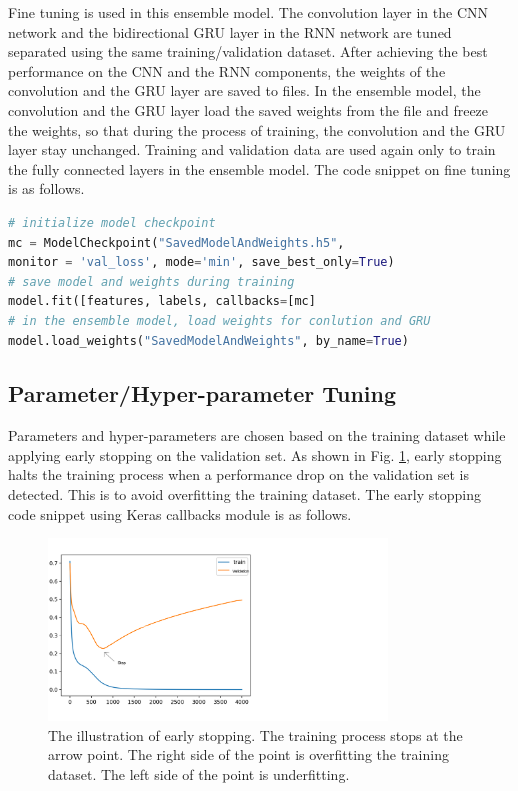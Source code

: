 Fine tuning is used in this ensemble model. The convolution layer in the CNN network and the bidirectional GRU layer in the RNN network are tuned separated using the same training/validation dataset. After achieving the best performance on the CNN and the RNN components, the weights of the convolution and the GRU layer are saved to files. In the ensemble model, the convolution and the GRU layer load the saved weights from the file and freeze the weights, so that during the process of training, the convolution and the GRU layer stay unchanged. Training and validation data are used again only to train the fully connected layers in the ensemble model. The code snippet on fine tuning is as follows.
\begin{lstlisting}[language=python,frame=single]
# initialize model checkpoint
mc = ModelCheckpoint("SavedModelAndWeights.h5",
monitor = 'val_loss', mode='min', save_best_only=True)
# save model and weights during training
model.fit([features, labels, callbacks=[mc]
# in the ensemble model, load weights for conlution and GRU
model.load_weights("SavedModelAndWeights", by_name=True)
\end{lstlisting}

\subsection{Parameter/Hyper-parameter Tuning}
Parameters and hyper-parameters are chosen based on the training dataset while applying early stopping \cite{prechelt1998early} on the validation set. As shown in Fig. \ref{fig_earlyStop}, early stopping halts the training process when a performance drop on the validation set is detected. This is to avoid overfitting the training dataset. The early stopping code snippet using Keras callbacks module is as follows.
\begin{figure}[!h]
\begin{center}
\includegraphics[width = 9cm]{img/early_stop.png}
\caption[The illustration of early stopping]{The illustration of early stopping. The training process stops at the arrow point. The right side of the point is overfitting the training dataset. The left side of the point is underfitting. \label{fig_earlyStop}}
\end{center}
\end{figure}

